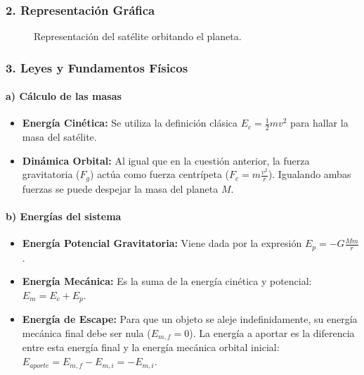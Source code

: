 \subsubsection*{2. Representación Gráfica}
\begin{figure}[H]
    \centering
    \caption{Representación del satélite orbitando el planeta.}
\end{figure}

\subsubsection*{3. Leyes y Fundamentos Físicos}
\paragraph*{a) Cálculo de las masas}
\begin{itemize}
    \item \textbf{Energía Cinética:} Se utiliza la definición clásica $E_c = \frac{1}{2}mv^2$ para hallar la masa del satélite.
    \item \textbf{Dinámica Orbital:} Al igual que en la cuestión anterior, la fuerza gravitatoria ($F_g$) actúa como fuerza centrípeta ($F_c = m \frac{v^2}{r}$). Igualando ambas fuerzas se puede despejar la masa del planeta $M$.
\end{itemize}
\paragraph*{b) Energías del sistema}
\begin{itemize}
    \item \textbf{Energía Potencial Gravitatoria:} Viene dada por la expresión $E_p = -G \frac{Mm}{r}$.
    \item \textbf{Energía Mecánica:} Es la suma de la energía cinética y potencial: $E_m = E_c + E_p$.
    \item \textbf{Energía de Escape:} Para que un objeto se aleje indefinidamente, su energía mecánica final debe ser nula ($E_{m,f} = 0$). La energía a aportar es la diferencia entre esta energía final y la energía mecánica orbital inicial: $E_{aporte} = E_{m,f} - E_{m,i} = -E_{m,i}$.
\end{itemize}

